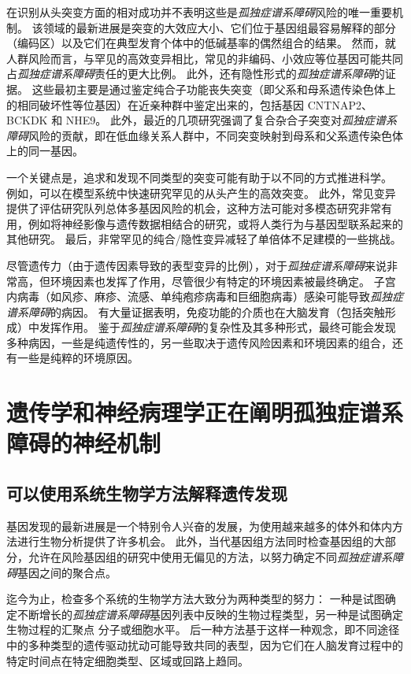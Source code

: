 在识别从头突变方面的相对成功并不表明这些是\textit{孤独症谱系障碍}风险的唯一重要机制。
该领域的最新进展是突变的大效应大小、它们位于基因组最容易解释的部分（编码区）以及它们在典型发育个体中的低碱基率的偶然组合的结果。
然而，就人群风险而言，与罕见的高效变异相比，常见的非编码、小效应等位基因可能共同占\textit{孤独症谱系障碍}责任的更大比例。
此外，还有隐性形式的\textit{孤独症谱系障碍}的证据。
这些最初主要是通过鉴定纯合子功能丧失突变（即父系和母系遗传染色体上的相同破坏性等位基因）在近亲种群中鉴定出来的，包括基因 CNTNAP2、BCKDK 和 NHE9。
此外，最近的几项研究强调了复合杂合子突变对\textit{孤独症谱系障碍}风险的贡献，即在低血缘关系人群中，不同突变映射到母系和父系遗传染色体上的同一基因。


一个关键点是，追求和发现不同类型的突变可能有助于以不同的方式推进科学。
例如，可以在模型系统中快速研究罕见的从头产生的高效突变。
此外，常见变异提供了评估研究队列总体多基因风险的机会，这种方法可能对多模态研究非常有用，例如将神经影像与遗传数据相结合的研究，或将人类行为与基因型联系起来的其他研究。
最后，非常罕见的纯合/隐性变异减轻了单倍体不足建模的一些挑战。


尽管遗传力（由于遗传因素导致的表型变异的比例），对于\textit{孤独症谱系障碍}来说非常高，但环境因素也发挥了作用，尽管很少有特定的环境因素被最终确定。
子宫内病毒（如风疹、麻疹、流感、单纯疱疹病毒和巨细胞病毒）感染可能导致\textit{孤独症谱系障碍}的病因。
有大量证据表明，免疫功能的介质也在大脑发育（包括突触形成）中发挥作用。
鉴于\textit{孤独症谱系障碍}的复杂性及其多种形式，最终可能会发现多种病因，一些是纯遗传性的，另一些取决于遗传风险因素和环境因素的组合，还有一些是纯粹的环境原因。



\section{遗传学和神经病理学正在阐明孤独症谱系障碍的神经机制}

\subsection{可以使用系统生物学方法解释遗传发现}

基因发现的最新进展是一个特别令人兴奋的发展，为使用越来越多的体外和体内方法进行生物分析提供了许多机会。
此外，当代基因组方法同时检查基因组的大部分，允许在风险基因组的研究中使用无偏见的方法，以努力确定不同\textit{孤独症谱系障碍}基因之间的聚合点。


迄今为止，检查多个系统的生物学方法大致分为两种类型的努力：
一种是试图确定不断增长的\textit{孤独症谱系障碍}基因列表中反映的生物过程类型，另一种是试图确定生物过程的汇聚点 分子或细胞水平。
后一种方法基于这样一种观念，即不同途径中的多种类型的遗传驱动扰动可能导致共同的表型，因为它们在人脑发育过程中的特定时间点在特定细胞类型、区域或回路上趋同。


